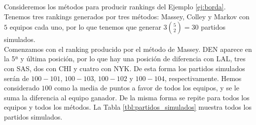 \begin{ejemplo} \label{ej:partidos_simulados}
Consideremos los métodos para producir rankings del Ejemplo \ref{ej:borda}. Tenemos tres rankings generados por tres métodos: Massey, Colley y Markov con $5$ equipos cada uno, por lo que tenemos que generar $3\binom{5}{2} = 30$ partidos simulados. \\

Comenzamos con el ranking producido por el método de Massey. DEN aparece en la 5ª y última posición, por lo que hay una posición de diferencia con LAL, tres con SAS, dos con CHI y cuatro con NYK. De esta forma los partidos simulados serán de $100-101$, $100-103$, $100-102$ y $100-104$, respectivamente. Hemos considerado $100$ como la media de puntos a favor de todos los equipos, y se le suma la diferencia al equipo ganador. De la misma forma se repite para todos los equipos y todos los métodos. La Tabla \ref{tbl:partidos_simulados} muestra todos los partidos simulados. \\


\end{ejemplo}
